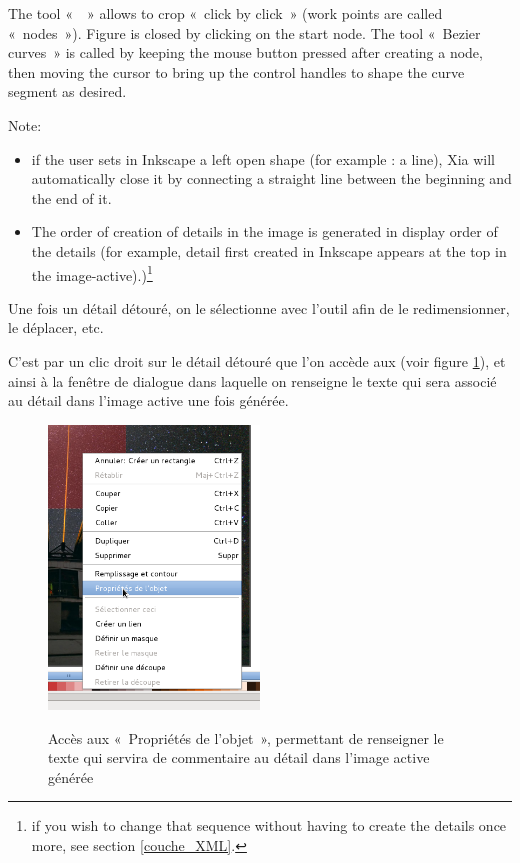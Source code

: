 {The tool «~~» 
allows to crop «~click by click~» (work points are called 
«~nodes~»).  Figure is closed by clicking on the start node. 
The tool «~Bezier curves~» is called by keeping the mouse button pressed 
after creating a node, then moving the cursor to bring up the control handles 
to shape the curve segment as desired.

Note:
\begin{itemize}
 \item if the user sets in Inkscape a left open shape (for
example : a line), Xia will automatically close it  by connecting a 
 straight line between the beginning and the end of it.
 \item The order of creation of details in the image is generated in display 
order of the details (for example, detail first created in
Inkscape appears at the top in the image-active).)\footnote{if you wish to change that sequence without having to create the details once more, see section \ref{couche_XML}.}
\end{itemize}

Une fois un détail détouré, on le sélectionne avec l'outil 
 afin de le redimensionner, le déplacer, etc.

C'est par un clic droit sur le détail détouré que l'on accède aux  (voir figure \ref{proprietes_objet}),
et ainsi à la fenêtre de dialogue dans laquelle on renseigne le texte qui sera associé au détail dans l'image active
une fois générée.

\begin{figure}[htp]
 \centering
 \caption{Accès aux «~Propriétés de l'objet~», permettant de renseigner le texte 
 qui servira de commentaire au détail dans l'image active générée}
 \includegraphics[width=0.5\textwidth]{./images/proprietes_objet}
 \label{proprietes_objet}
\end{figure}

}
